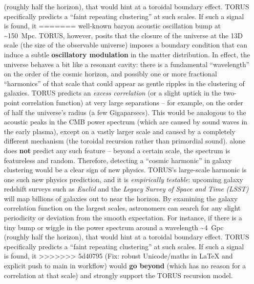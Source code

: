 \documentclass[]{article}
\begin{document}
\begin{itemize}
  (roughly half the horizon), that would hint at a toroidal boundary
  effect\hspace{0pt}. TORUS specifically predicts a ``faint repeating
  clustering'' at such scales\hspace{0pt}. If such a signal is found, it
=======
  well-known baryon acoustic oscillation bump at
  \textasciitilde{}150~Mpc. TORUS, however, posits that the closure of
  the universe at the 13D scale (the size of the observable universe)
  imposes a boundary condition that can induce a subtle
  \textbf{oscillatory modulation} in the matter distribution​. In
  effect, the universe behaves a bit like a resonant cavity: there is a
  fundamental ``wavelength'' on the order of the cosmic horizon, and
  possibly one or more fractional ``harmonics'' of that scale that could
  appear as gentle ripples in the clustering of galaxies. TORUS predicts
  an \emph{excess correlation} (or a slight uptick in the two-point
  correlation function) at very large separations -- for example, on the
  order of half the universe's radius (a few Gigaparsecs)​. This would
  be analogous to the acoustic peaks in the CMB power spectrum (which
  are caused by sound waves in the early plasma), except on a vastly
  larger scale and caused by a completely different mechanism (the
  toroidal recursion rather than primordial sound). \LambdaCDM alone does
  \textbf{not} predict any such feature -- beyond a certain scale, the
  \LambdaCDM spectrum is featureless and random. Therefore, detecting a
  ``cosmic harmonic'' in galaxy clustering would be a clear sign of new
  physics. TORUS's large-scale harmonic is one such new physics
  prediction, and it is \emph{empirically testable}: upcoming galaxy
  redshift surveys such as \emph{Euclid} and the \emph{Legacy Survey of
  Space and Time (LSST)} will map billions of galaxies out to near the
  horizon. By examining the galaxy correlation function on the largest
  scales, astronomers can search for any slight periodicity or deviation
  from the smooth \LambdaCDM expectation​. For instance, if there is a tiny
  bump or wiggle in the power spectrum around a wavelength
  \textasciitilde{}4~Gpc (roughly half the horizon), that would hint at
  a toroidal boundary effect​. TORUS specifically predicts a ``faint
  repeating clustering'' at such scales​. If such a signal is found, it
>>>>>>> 5d40795 (Fix: robust Unicode/maths in LaTeX and explicit push to main in workflow)
  would \textbf{go beyond \LambdaCDM} (which has no reason for a correlation
  at that scale) and strongly support the TORUS recursion model.

\end{itemize}
\end{document}
